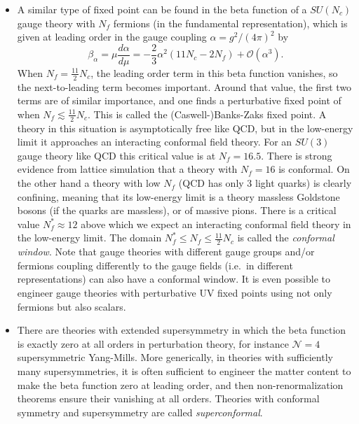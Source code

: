 \documentclass[a4paper,12pt]{article}
\renewcommand{\O}{\mathcal{O}}
\numberwithin{equation}{section}
\begin{document}
\begin{itemize}
\item
A similar type of fixed point can be found in the beta function of a $SU(N_c)$ gauge theory with $N_f$ fermions (in the fundamental representation), which is given at leading order in the gauge coupling $\alpha = g^2/(4\pi)^2$ by
\begin{equation}
	\beta_\alpha = \mu \frac{d\alpha}{d\mu}
	= -\frac{2}{3} \alpha^2 \left(11 N_c - 2 N_f \right)
	+ \O(\alpha^3).
\end{equation}
When $N_f = \frac{11}{2} N_c$, the leading order term in this beta function vanishes, so the next-to-leading term becomes important. Around that value, the first two terms are of similar importance, and one finds a perturbative fixed point of when $N_f \lesssim \frac{11}{2} N_c$. This is called the (Caswell-)Banks-Zaks fixed point. A theory in this situation is asymptotically free like QCD, but in the low-energy limit it approaches an interacting conformal field theory.
For an $SU(3)$ gauge theory like QCD this critical value is at $N_f = 16.5$. There is strong evidence from lattice simulation that a theory with $N_f = 16$ is conformal. On the other hand a theory with low $N_f$ (QCD has only 3 light quarks) is clearly confining, meaning that its low-energy limit is a theory massless Goldstone bosons (if the quarks are massless), or of massive pions. There is a critical value $N_f^* \approx 12$ above which we expect an interacting conformal field theory in the low-energy limit. The domain $N_f^* \leq N_f \leq \frac{11}{2} N_c$ is called the \emph{conformal window}. Note that gauge theories with different gauge groups and/or fermions coupling differently to the gauge fields (i.e.~in different representations) can also have a conformal window. It is even possible to engineer gauge theories with perturbative UV fixed points using not only fermions but also scalars.

\item
There are theories with extended supersymmetry in which the beta function is exactly zero at all orders in perturbation theory, for instance $\mathcal{N} = 4$ supersymmetric Yang-Mills. More generically, in theories with sufficiently many supersymmetries, it is often sufficient to engineer the matter content to make the beta function zero at leading order, and then non-renormalization theorems ensure their vanishing at all orders. Theories with conformal symmetry and supersymmetry are called \emph{superconformal}.


\end{itemize}
\end{document}
